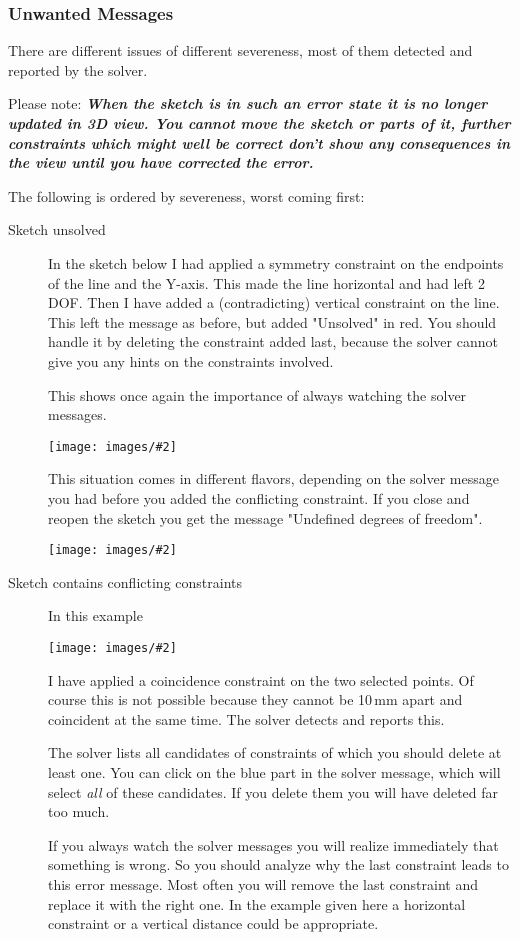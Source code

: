 \documentclass[12pt,titlepage]{article}
\newcommand{\icon}[1]{\raisebox{-1em}{\rule{0pt}{27pt}\texttt{[image: images/\#1]}}}
\newcommand{\img}[2]{\vspace{2ex}\noindent\texttt{[image: images/\#2]}}
\begin{document}
\subsubsection{Unwanted Messages} There are different issues of different severeness, most of them detected and reported by the solver.

Please note: {\bf\em When the sketch is in such an error state it is no longer updated in 3D view. You cannot move the sketch or parts of it, further constraints which might well be correct don't show any consequences in the view until you have corrected the error.}

The following is ordered by severeness, worst coming first: \begin{description} 
\item [Sketch unsolved] In the sketch below I had applied a symmetry constraint on the endpoints of the line and the Y-axis. This made the line horizontal and had left 2 DOF. Then I have added a (contradicting) vertical constraint on the line. This left the message as before, but added "Unsolved" in red. You should handle it by deleting the constraint added last, because the solver cannot give you any hints on the constraints involved.
	
	This shows once again the importance of always watching the solver messages.
	
	\img{}{ConstraintsSolverUnsolved}
	
	This situation comes in different flavors, depending on the solver message you had before you added the conflicting constraint. If you close and reopen the sketch you get the message "Undefined degrees of freedom".
	
	\img{}{ConstraintsSolverUndefined}
	
	
\item [Sketch contains conflicting constraints] In this example
	
	\img{}{ConstraintsSolverConflicting}
	
	I have applied a coincidence constraint on the two selected points. Of course this is not possible because they cannot be 10\,mm apart and coincident at the same time. The solver detects and reports this.
	
	The solver lists all candidates of constraints of which you should delete at least one. You can click on the blue part in the solver message, which will select \emph{all} of these candidates. If you delete them you will have deleted far too much.
	
	If you always watch the solver messages you will realize immediately that something is wrong. So you should analyze why the last constraint leads to this error message. Most often you will remove the last constraint and replace it with the right one. In the example given here a horizontal constraint \icon{Constraint_Horizontal} or a vertical distance \icon{Constraint_VerticalDistance} could be appropriate.
	

\end{description}
\end{document}
